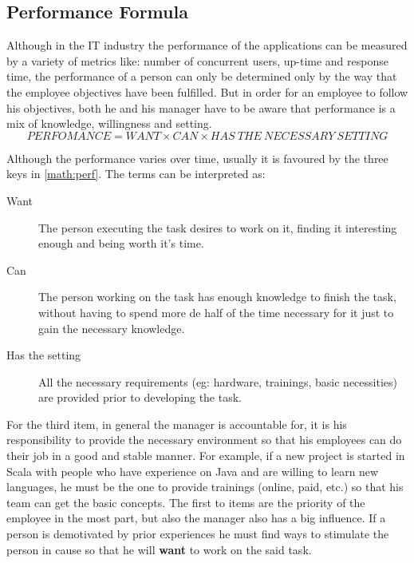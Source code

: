 
\subsection{Performance Formula}
\label{sub-sec:formula}
Although in the IT industry the performance of the applications can be measured by a variety of metrics like: number of concurrent users, up-time and response time, the performance of a person can only be determined only by the way that the employee objectives have been fulfilled. 
But in order for an employee to follow his objectives, both he and his manager have to be aware that performance is a mix of knowledge, willingness and setting.
\begin{equation}
\label{math:perf}
PERFOMANCE = WANT \times CAN \times HAS\ THE\ NECESSARY\ SETTING
\end{equation}

Although the performance varies over time, usually it is favoured by the three keys in \cref{math:perf}. The terms can be interpreted as:
\begin{description}
\item[Want] The person executing the task desires to work on it, finding it interesting enough and being worth it's time.
\item[Can] The person working on the task has enough knowledge to finish the task, without having to spend more de half of the time necessary for it just to gain the necessary knowledge. 
\item[Has the setting] All the necessary requirements (eg: hardware, trainings, basic necessities) are provided prior to developing the task.
\end{description}

For the third item, in general the manager is accountable for, it is his responsibility to provide the necessary environment so that his employees can do their job in a good and stable manner. For example, if a new project is started in Scala with people who have experience on Java and are willing to learn new languages, he must be the one to provide trainings (online, paid, etc.) so that his team can get the basic concepts. The first to items are the priority of the employee in the most part, but also the manager also has a big influence. If a person is demotivated by prior experiences he must find ways to stimulate the person in cause so that he will \textbf{want} to work on the said task.

